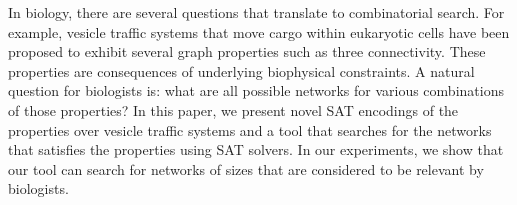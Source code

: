 In biology, there are several questions that translate to combinatorial
search. For example, vesicle traffic systems that move cargo within
eukaryotic cells have been proposed to exhibit several graph properties
such as three connectivity. These properties are consequences of underlying
biophysical constraints. A natural question for biologists is: what are all
possible networks for various combinations of those properties? In this
paper, we present novel SAT encodings of the properties over vesicle traffic
systems and a tool that searches for the networks that satisfies the
properties using SAT solvers. In our experiments, we show that our tool
can search for networks of sizes that are considered to be relevant by
biologists.



